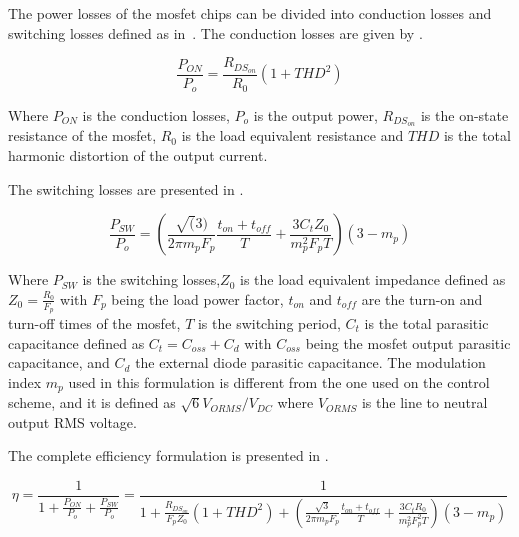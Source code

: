 The power losses of the \gls{mosfet} chips can be divided into conduction losses and switching losses defined as in~\cite{Costa:SiC_MOSFET_losses:2023}. The conduction losses are given by .

\begin{equation}
	\frac{P_{ON}}{P_o} = \frac{R_{DS_{on}}}{R_0} (1+THD^2)
	\label{eq:conduction_losses}
\end{equation}

Where $P_{ON}$ is the conduction losses, $P_o$ is the output power, $R_{DS_{on}}$ is the on-state resistance of the \gls{mosfet}, $R_0$ is the load equivalent resistance and $THD$ is the total harmonic distortion of the output current.

The switching losses are presented in .

\begin{equation}
	\frac{P_{SW}}{P_o} = \left( \frac{\sqrt(3)}{2\pi m_p F_p}\frac{t_{on}+t_{off}}{T}+\frac{3 C_t Z_0}{m_p^2 F_p T} \right)(3-m_p)
	\label{eq:switching_losses}
\end{equation}

Where $P_{SW}$ is the switching losses,$Z_0$ is the load equivalent impedance defined as $Z_0 = \frac{R_0}{F_p}$ with $F_p$ being the load power factor, $t_{on}$ and $t_{off}$ are the turn-on and turn-off times of the \gls{mosfet}, $T$ is the switching period, $C_t$ is the total parasitic capacitance defined as $C_t = C_{oss} + C_d$ with $C_{oss}$ being the \gls{mosfet} output parasitic capacitance, and $C_d$ the external diode parasitic capacitance. The modulation index $m_p$ used in this formulation is different from the one used on the control scheme, and it is defined as $\sqrt{6} V_{ORMS}/V_{DC}$ where $V_{ORMS}$ is the line to neutral output RMS voltage.

The complete efficiency formulation is presented in .

\begin{equation}
	\eta = \frac{1}{1 + \frac{P_{ON}}{P_o} + \frac{P_{SW}}{P_o}} = \frac{1}{1 + \frac{R_{DS_{on}}}{F_p Z_0} (1+THD^2) + \left( \frac{\sqrt{3}}{2\pi m_p F_p}\frac{t_{on}+t_{off}}{T}+\frac{3 C_t R_0}{m_p^2 F_p^2 T} \right)(3-m_p)}
	\label{eq:efficiency}
\end{equation}


